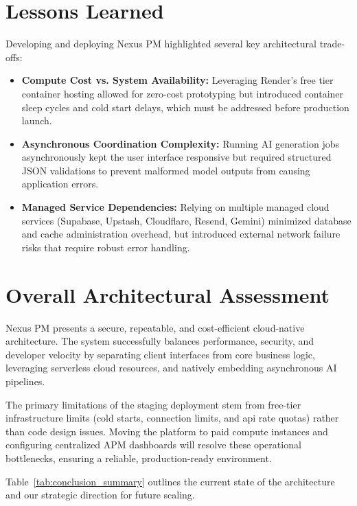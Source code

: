 \section{Lessons Learned}
Developing and deploying Nexus PM highlighted several key architectural trade-offs:
\begin{itemize}
    \item \textbf{Compute Cost vs. System Availability:} Leveraging Render's free tier container hosting allowed for zero-cost prototyping but introduced container sleep cycles and cold start delays, which must be addressed before production launch.
    \item \textbf{Asynchronous Coordination Complexity:} Running AI generation jobs asynchronously kept the user interface responsive but required structured JSON validations to prevent malformed model outputs from causing application errors.
    \item \textbf{Managed Service Dependencies:} Relying on multiple managed cloud services (Supabase, Upstash, Cloudflare, Resend, Gemini) minimized database and cache administration overhead, but introduced external network failure risks that require robust error handling.
\end{itemize}

\pagebreak
\section{Overall Architectural Assessment}
Nexus PM presents a secure, repeatable, and cost-efficient cloud-native architecture. The system successfully balances performance, security, and developer velocity by separating client interfaces from core business logic, leveraging serverless cloud resources, and natively embedding asynchronous AI pipelines. 

The primary limitations of the staging deployment stem from free-tier infrastructure limits (cold starts, connection limits, and api rate quotas) rather than code design issues. Moving the platform to paid compute instances and configuring centralized APM dashboards will resolve these operational bottlenecks, ensuring a reliable, production-ready environment.

Table~\ref{tab:conclusion_summary} outlines the current state of the architecture and our strategic direction for future scaling.

